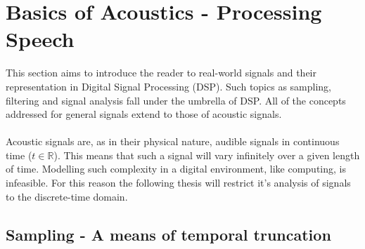 \chapter{Basics of Acoustics - Processing Speech}\label{ch-bas-acou}
This section aims to introduce the reader to real-world signals and their representation in Digital Signal Processing (DSP). Such topics as sampling, filtering  and signal analysis fall under the umbrella of DSP. All of the concepts addressed for general signals extend to those of acoustic signals.\\ \\
Acoustic signals are, as in their physical nature, audible signals in continuous time ($t \in \mathbb{R}$). This means that such a signal will vary infinitely over a given length of time. Modelling such complexity in a digital environment, like computing, is infeasible. For this reason the following thesis will restrict it's analysis of signals to the discrete-time domain.

\section{Sampling - A means of temporal truncation}
